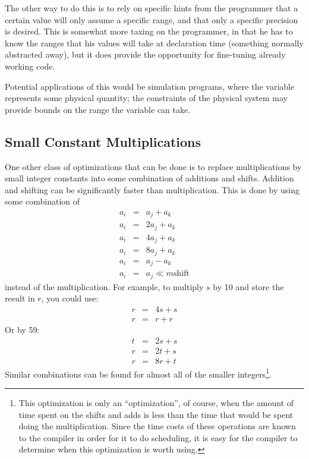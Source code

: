 The other way to do this is to rely on specific hints from the programmer
that a certain value will only assume a specific range, and that only a
specific precision is desired.  This is somewhat more taxing on the
programmer, in that he has to know the ranges that his values will take at
declaration time (something normally abstracted away), but it does provide
the opportunity for fine-tuning already working code.

Potential applications of this would be simulation programs, where the
variable represents some physical quantity; the constraints of the physical
system may provide bounds on the range the variable can take.
\subsection{Small Constant Multiplications}

One other class of optimizations that can be done is to replace
multiplications by small integer constants into some combination of
additions and shifts.  Addition and shifting can be significantly faster
than multiplication.  This is done by using some combination of
\begin{eqnarray*}
a_i & = & a_j + a_k \\
a_i & = & 2a_j + a_k \\
a_i & = & 4a_j + a_k \\
a_i & = & 8a_j + a_k \\
a_i & = & a_j - a_k \\
a_i & = & a_j \ll m \mbox{shift}
\end{eqnarray*}
instead of the multiplication.  For example, to multiply $s$ by 10 and store
the result in $r$, you could use:
\begin{eqnarray*}
r & = & 4s + s\\
r & = & r + r
\end{eqnarray*}
Or by 59:
\begin{eqnarray*}
t & = & 2s + s \\
r & = & 2t + s \\
r & = & 8r + t
\end{eqnarray*}
Similar combinations can be found for almost all of the smaller
integers\footnote{This optimization is only an ``optimization'', of course,
when the amount of time spent on the shifts and adds is less than the time
that would be spent doing the multiplication.  Since the time costs of these
operations are known to the compiler in order for it to do scheduling, it is
easy for the compiler to determine when this optimization is worth using.}.
\cite{magenheimer:precision}

